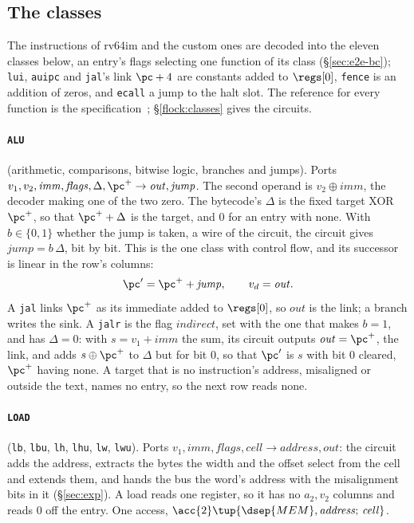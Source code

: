 \subsection{The classes}\label{sec:tab-classes}

The instructions of rv64im and the custom ones are decoded into the eleven classes below, an entry's flags selecting one function of its class (\S\ref{sec:e2e-bc}); \texttt{lui}, \texttt{auipc} and \texttt{jal}'s link $\pc+4$ are constants added to $\regs[0]$, \texttt{fence} is an addition of zeros, and \texttt{ecall} a jump to the halt slot. The reference for every function is the specification~\cite{riscv}; \S\ref{flock:classes} gives the circuits.

\paragraph{\texttt{ALU}} (arithmetic, comparisons, bitwise logic, branches and jumps). Ports $v_1,v_2,\mathit{imm},\mathit{flags},\Delta,\pc^{+}\to\mathit{out},\mathit{jump}$. The second operand is $v_2\oplus\mathit{imm}$, the decoder making one of the two zero. The bytecode's $\Delta$ is the fixed target XOR $\pc^{+}$, so that $\pc^{+}+\Delta$ is the target, and $0$ for an entry with none. With $b\in\{0,1\}$ whether the jump is taken, a wire of the circuit, the circuit gives $\mathit{jump}=b\,\Delta$, bit by bit. This is the one class with control flow, and its successor is linear in the row's columns:
\[
  \pc'=\pc^{+}+\mathit{jump},\qquad v_d=\mathit{out}.
\]
A \texttt{jal} links $\pc^{+}$ as its immediate added to $\regs[0]$, so $\mathit{out}$ is the link; a branch writes the sink. A \texttt{jalr} is the flag $\mathit{indirect}$, set with the one that makes $b=1$, and has $\Delta=0$: with $s=v_1+\mathit{imm}$ the sum, its circuit outputs $\mathit{out}=\pc^{+}$, the link, and adds $s\oplus\pc^{+}$ to $\Delta$ but for bit $0$, so that $\pc'$ is $s$ with bit $0$ cleared, $\pc^{+}$ having none. A target that is no instruction's address, misaligned or outside the text, names no entry, so the next row reads none.

\paragraph{\texttt{LOAD}} (\texttt{lb}, \texttt{lbu}, \texttt{lh}, \texttt{lhu}, \texttt{lw}, \texttt{lwu}). Ports $v_1,\mathit{imm},\mathit{flags},\mathit{cell}\to\mathit{address},\mathit{out}$: the circuit adds the address, extracts the bytes the width and the offset select from the cell and extends them, and hands the bus the word's address with the misalignment bits in it (\S\ref{sec:exp}). A load reads one register, so it has no $a_2,v_2$ columns and reads $0$ off the entry. One access, $\acc{2}\tup{\dsep{MEM},\mathit{address};\,\mathit{cell}}$.

